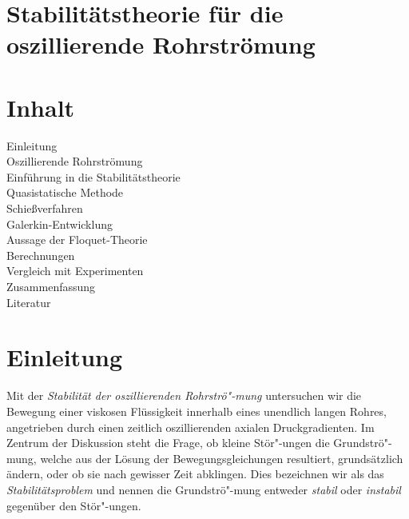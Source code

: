 \documentclass[10pt,a5paper,oneside,draft]{book}
\numberwithin{equation}{chapter}
\begin{document}
\setcounter{page}{-1}
\renewcommand\baselinestretch{1.2}\normalfont
\chapter*{Stabilit\"atstheorie f\"ur die oszillierende Rohrstr\"omung}

\renewcommand\baselinestretch{1}\normalfont
\chapter*{Inhalt}
	\newcommand{\cleantoc}[2]{#1\,\dotfill\,#2\\}
	\newcommand{\chaptoc}[3]{\makebox[2em][l]{\S\,#1.}#2\,\dotfill\,#3\\}
	\newcommand{\sectoc}[3]{\hspace*{2em}\makebox[1.5em][l]{#1.}#2\,\dotfill\,#3\\}

	\renewcommand\baselinestretch{1.2}\normalfont
	\cleantoc{Einleitung}{\pageref{sec:einleitung}}
	\chaptoc{1}{Oszillierende Rohrstr\"omung}{\pageref{sec:rohrstroemung}}
	\chaptoc{2}{Einf\"uhrung in die Stabilit\"atstheorie}{\pageref{sec:stabilitaetstheorie}}
	\chaptoc{3}{Quasistatische Methode}{\pageref{sec:quasistatik}}
		\sectoc{A}{Schie{\ss}verfahren}{\pageref{sec:schiessverfahren}}
		\sectoc{B}{Galerkin-Entwicklung}{\pageref{sec:galerkin}}
	\chaptoc{4}{Aussage der Floquet-\!Theorie}{\pageref{sec:floquet}}
	\chaptoc{5}{Berechnungen}{\pageref{sec:berechnungen}}
	\chaptoc{6}{Vergleich mit Experimenten}{\pageref{sec:experimente}}
	\cleantoc{Zusammenfassung}{\pageref{sec:zusammenfassung}}
	\cleantoc{Literatur}{\pageref{sec:literatur}}

	\renewcommand\baselinestretch{1}\normalfont

\chapter*{Einleitung}\label{sec:einleitung}
\pagestyle{intro}
Mit der \textit{Stabilit\"at der oszillierenden Rohrstr\"o"-mung} untersuchen wir die Bewegung einer viskosen Fl\"ussigkeit innerhalb eines unendlich langen Rohres, angetrieben durch einen zeitlich oszillierenden axialen Druckgradienten.
Im Zentrum der Diskussion steht die Frage, ob kleine St\"or"-ungen die Grundstr\"o"-mung, welche aus der L\"osung der Bewegungsgleichungen resultiert, grunds\"atzlich \"andern, oder ob sie nach gewisser Zeit abklingen.
Dies bezeichnen wir als das \textit{Stabilit\"atsproblem} und nennen die Grundstr\"o"-mung entweder \textit{stabil} oder \textit{instabil} gegen\"uber den St\"or"-ungen.\\
\end{document}
